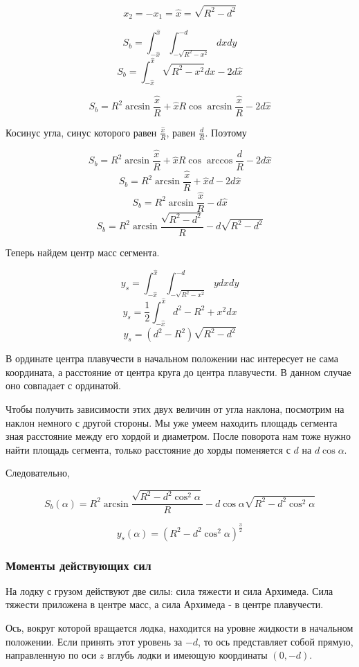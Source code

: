 \documentclass[12pt,a4paper]{article}
\begin{document}
$$ x_2 = -x_1 = \hat{x} =\sqrt{R^2 - d^2} $$

$$ S_b = \int_{-\hat{x}}^{\hat{x}} \int_{-\sqrt{R^2-x^2}}^{-d} dx dy $$
$$ S_b = \int_{-\hat{x}}^{\hat{x}} \sqrt{R^2-x^2} dx - 2d\hat{x} $$

$$ S_b = R^2 \arcsin\frac{\hat{x}}{R} + \hat{x}R\cos\arcsin\frac{\hat{x}}{R} - 2d\hat{x} $$

Косинус угла, синус которого равен $\frac{\hat{x}}{R}$, равен $\frac{d}{R}$. Поэтому

$$ S_b = R^2 \arcsin\frac{\hat{x}}{R} + \hat{x}R\cos\arccos\frac{d}{R} - 2d\hat{x} $$
$$ S_b = R^2 \arcsin\frac{\hat{x}}{R} + \hat{x}d - 2d\hat{x} $$
$$ S_b = R^2 \arcsin\frac{\hat{x}}{R} - d\hat{x} $$
$$ S_b = R^2 \arcsin\frac{\sqrt{R^2-d^2}}{R} - d\sqrt{R^2-d^2} $$

Теперь найдем центр масс сегмента.

$$ y_s = \int_{-\hat{x}}^{\hat{x}} \int_{-\sqrt{R^2-x^2}}^{-d} y dx dy $$
$$ y_s = \frac{1}{2} \int_{-\hat{x}}^{\hat{x}} d^2 - R^2 + x^2 dx $$
$$ y_s = (d^2 - R^2)\sqrt{R^2-d^2}  $$

В ординате центра плавучести в начальном положении нас интересует не сама координата, а расстояние от центра круга до центра плавучести. В данном случае оно совпадает с ординатой.

Чтобы получить зависимости этих двух величин от угла наклона, посмотрим на наклон немного с другой стороны. Мы уже умеем находить площадь сегмента зная расстояние между его хордой и диаметром. После поворота нам тоже нужно найти площадь сегмента, только расстояние до хорды поменяется с $d$ на $d\cos\alpha$. 

Следовательно, 

$$ S_b(\alpha) = R^2 \arcsin\frac{\sqrt{R^2-d^2\cos^2\alpha}}{R} - d\cos\alpha\sqrt{R^2-d^2\cos^2\alpha} $$

$$ y_s(\alpha) = (R^2-d^2\cos^2\alpha)^{\frac{3}{2}} $$


\subsubsection{Моменты действующих сил}

На лодку с грузом действуют две силы: сила тяжести и сила Архимеда. Сила тяжести приложена в центре масс, а сила Архимеда - в центре плавучести. 

Ось, вокруг которой вращается лодка, находится на уровне жидкости в начальном положении. Если принять этот уровень за $-d$, то ось представляет собой прямую, направленную по оси $z$ вглубь лодки и имеющую координаты $(0, -d)$.
\end{document}
